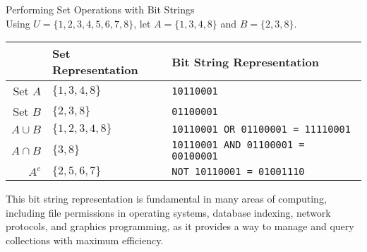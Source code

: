 \begin{example}Performing Set Operations with Bit Strings\\
    Using $U = \{1, 2, 3, 4, 5, 6, 7, 8\}$, let $A = \{1, 3, 4, 8\}$ and $B = \{2, 3, 8\}$.
    
    \begin{center}
    \renewcommand{\arraystretch}{1.4}
    \begin{tabular}{rll}
         & \textbf{Set Representation} & \textbf{Bit String Representation} \\
        \hline
        Set $A$ & $\{1, 3, 4, 8\}$ & \texttt{10110001} \\
        Set $B$ & $\{2, 3, 8\}$ & \texttt{01100001} \\
        \hline
        $A \cup B$ & $\{1, 2, 3, 4, 8\}$ & \texttt{10110001 OR 01100001 = 11110001} \\
        $A \cap B$ & $\{3, 8\}$ & \texttt{10110001 AND 01100001 = 00100001} \\
        $A^c$ & $\{2, 5, 6, 7\}$ & \texttt{NOT 10110001 = 01001110} \\
    \end{tabular}
    \end{center}
\end{example}

This bit string representation is fundamental in many areas of computing, including file permissions in operating systems, database indexing, network protocols, and graphics programming, as it provides a way to manage and query collections with maximum efficiency.